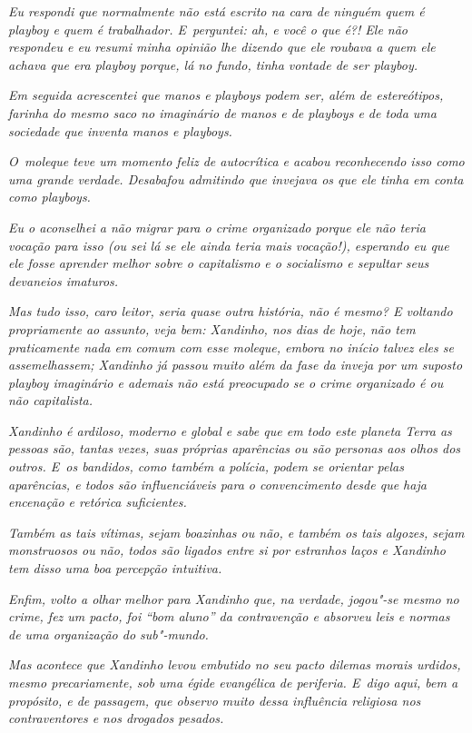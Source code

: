\emph{Eu respondi que normalmente não está escrito na cara de ninguém
quem é playboy e quem é trabalhador. E~perguntei: ah, e você o que é?!
Ele não respondeu e eu resumi minha opinião lhe dizendo que ele roubava
a quem ele achava que era playboy porque, lá no fundo, tinha vontade de
ser playboy.}

\emph{Em seguida acrescentei que manos e playboys podem ser, além de
estereótipos, farinha do mesmo saco no imaginário de manos e de playboys
e de toda uma sociedade que inventa manos e playboys.}

\emph{O~moleque teve um momento feliz de autocrítica e acabou
reconhecendo isso como uma grande verdade. Desabafou admitindo que
invejava os que ele tinha em conta como playboys.}

\emph{Eu o aconselhei a não migrar para o crime organizado porque ele
não teria vocação para isso (ou sei lá se ele ainda teria mais
vocação!), esperando eu que ele fosse aprender melhor sobre o
capitalismo e o socialismo e sepultar seus devaneios imaturos.}

\emph{Mas tudo isso, caro leitor, seria quase outra história, não é
mesmo? E voltando propriamente ao assunto, veja bem: Xandinho, nos dias
de hoje, não tem praticamente nada em comum com esse moleque, embora no
início talvez eles se assemelhassem; Xandinho já passou muito além da
fase da inveja por um suposto playboy imaginário e ademais não está
preocupado se o crime organizado é ou não capitalista.}

\emph{Xandinho é ardiloso, moderno e global e sabe que em todo este
planeta Terra as pessoas são, tantas vezes, suas próprias aparências ou
são personas aos olhos dos outros. E~os bandidos, como também a polícia,
podem se orientar pelas aparências, e todos são influenciáveis para o
convencimento desde que haja encenação e retórica suficientes.}

\emph{Também as tais vítimas, sejam boazinhas ou não, e também os tais
algozes, sejam monstruosos ou não, todos são ligados entre si por
estranhos laços e Xandinho tem disso uma boa percepção intuitiva.}

\emph{Enfim, volto a olhar melhor para Xandinho que, na verdade,
jogou"-se mesmo no crime, fez um pacto, foi ``bom aluno'' da contravenção
e absorveu leis e normas de uma organização do sub"-mundo.}

\emph{Mas acontece que Xandinho levou embutido no seu pacto dilemas
morais urdidos, mesmo precariamente, sob uma égide evangélica de
periferia. E~digo aqui, bem a propósito, e de passagem, que observo
muito dessa influência religiosa nos contraventores e nos drogados
pesados.}

